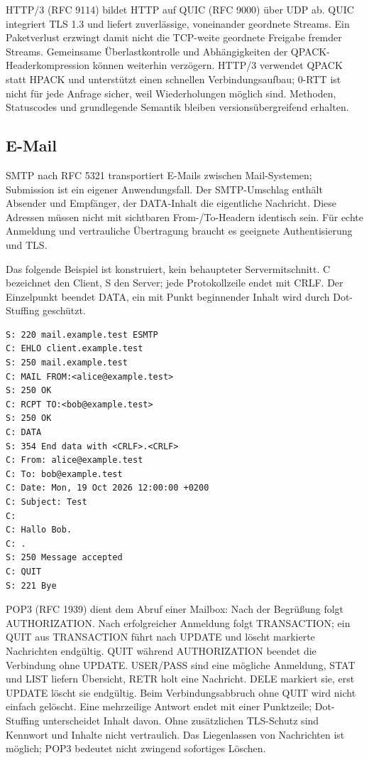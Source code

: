 \documentclass[a4paper,11pt]{article}
\newif\ifexplain
\newcommand{\explain}[1]{\ifexplain\begin{erklbox}#1\end{erklbox}\fi}
\begin{document}
HTTP/3 (RFC 9114) bildet HTTP auf QUIC (RFC 9000) über UDP ab. QUIC integriert TLS 1.3 und liefert zuverlässige, voneinander geordnete Streams. Ein Paketverlust erzwingt damit nicht die TCP-weite geordnete Freigabe fremder Streams. Gemeinsame Überlastkontrolle und Abhängigkeiten der QPACK-Headerkompression können weiterhin verzögern. HTTP/3 verwendet QPACK statt HPACK und unterstützt einen schnellen Verbindungsaufbau; 0-RTT ist nicht für jede Anfrage sicher, weil Wiederholungen möglich sind. Methoden, Statuscodes und grundlegende Semantik bleiben versionsübergreifend erhalten.
\explain{Multiplexing heißt: Mehrere logische Gespräche teilen sich eine Verbindung. HTTP/2 löst dabei die Reihenfolge der HTTP-Antworten von einem einzigen Antwortstrom. Die darunterliegende TCP-Reihenfolge bleibt jedoch bestehen. QUIC kann Nutzdaten eines anderen Streams freigeben, obwohl in einem Stream noch etwas fehlt.}
\subsection*{E-Mail}
SMTP nach RFC 5321 transportiert E-Mails zwischen Mail-Systemen; Submission ist ein eigener Anwendungsfall. Der SMTP-Umschlag enthält Absender und Empfänger, der DATA-Inhalt die eigentliche Nachricht. Diese Adressen müssen nicht mit sichtbaren From-/To-Headern identisch sein. Für echte Anmeldung und vertrauliche Übertragung braucht es geeignete Authentisierung und TLS.

Das folgende Beispiel ist konstruiert, kein behaupteter Servermitschnitt. C bezeichnet den Client, S den Server; jede Protokollzeile endet mit CRLF. Der Einzelpunkt beendet DATA, ein mit Punkt beginnender Inhalt wird durch Dot-Stuffing geschützt.
\begin{lstlisting}
S: 220 mail.example.test ESMTP
C: EHLO client.example.test
S: 250 mail.example.test
C: MAIL FROM:<alice@example.test>
S: 250 OK
C: RCPT TO:<bob@example.test>
S: 250 OK
C: DATA
S: 354 End data with <CRLF>.<CRLF>
C: From: alice@example.test
C: To: bob@example.test
C: Date: Mon, 19 Oct 2026 12:00:00 +0200
C: Subject: Test
C:
C: Hallo Bob.
C: .
S: 250 Message accepted
C: QUIT
S: 221 Bye
\end{lstlisting}
POP3 (RFC 1939) dient dem Abruf einer Mailbox: Nach der Begrüßung folgt AUTHORIZATION. Nach erfolgreicher Anmeldung folgt TRANSACTION; ein QUIT aus TRANSACTION führt nach UPDATE und löscht markierte Nachrichten endgültig. QUIT während AUTHORIZATION beendet die Verbindung ohne UPDATE. USER/PASS sind eine mögliche Anmeldung, STAT und LIST liefern Übersicht, RETR holt eine Nachricht. DELE markiert sie, erst UPDATE löscht sie endgültig. Beim Verbindungsabbruch ohne QUIT wird nicht einfach gelöscht. Eine mehrzeilige Antwort endet mit einer Punktzeile; Dot-Stuffing unterscheidet Inhalt davon. Ohne zusätzlichen TLS-Schutz sind Kennwort und Inhalte nicht vertraulich. Das Liegenlassen von Nachrichten ist möglich; POP3 bedeutet nicht zwingend sofortiges Löschen.
\end{document}
